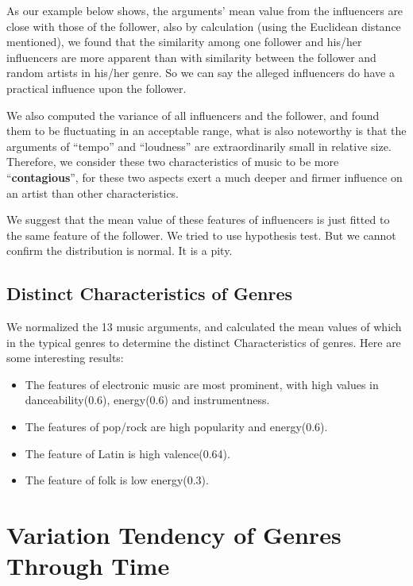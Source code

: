 \documentclass[12pt]{article}
\begin{document}
As our example below shows, the arguments’ mean value from the influencers are close with those of the follower, also by calculation (using the Euclidean distance mentioned), we found that the similarity among one follower and his/her influencers are more apparent than  with  similarity between the follower and random artists in his/her genre. So we can say the alleged influencers do have a practical influence upon the follower.

We also computed the variance of all influencers and the follower, and found them to be fluctuating in an acceptable range, what is also noteworthy is that the arguments of ``tempo'' and ``loudness'' are extraordinarily small in relative size. Therefore, we consider these two characteristics of music to be more ``\textbf{contagious}'', for these two aspects exert a much deeper and firmer influence on an artist than other characteristics.\par
We suggest that the mean value of these features of influencers is just fitted to the same feature of the follower. We tried to use hypothesis test. But we cannot confirm the distribution is normal. It is a pity.

\subsection{Distinct Characteristics of Genres}\quad\;
We normalized the 13 music arguments, and calculated the mean values of which in the typical genres to determine the distinct Characteristics of genres.
Here are some interesting results:

\begin{itemize}
\item The features of electronic music are most prominent, with high values in danceability(0.6), energy(0.6) and instrumentness.\\
\item The features of pop/rock are high popularity and energy(0.6).\\
\item  The feature of Latin is high valence(0.64).\\
\item The feature of folk is low energy(0.3).\\
\end{itemize}
\section{Variation Tendency of Genres Through Time}
\end{document}
